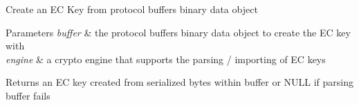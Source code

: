 Create an EC Key from protocol buffers binary data object


\begin{DoxyParams}{Parameters}
{\em buffer} & the protocol buffers binary data object to create the EC key with \\
\hline
{\em engine} & a crypto engine that supports the parsing / importing of EC keys \\
\hline
\end{DoxyParams}
\begin{DoxyReturn}{Returns}
an EC key created from serialized bytes within \textquotesingle{}buffer\textquotesingle{} or N\+U\+LL if parsing buffer fails 
\end{DoxyReturn}
